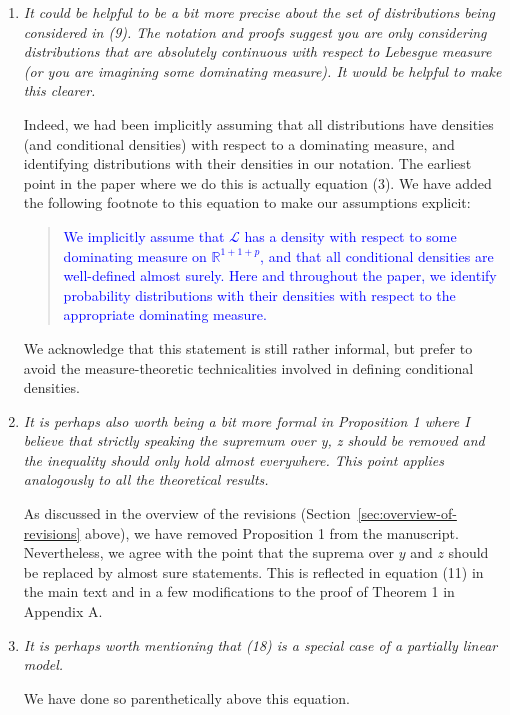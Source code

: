\documentclass[12pt]{article}
\begin{document}
\begin{enumerate}
	\item \textsl{It could be helpful to be a bit more precise about the set of distributions being considered in (9). The notation and proofs suggest you are only considering distributions that are absolutely continuous with respect to Lebesgue measure (or you are imagining some dominating measure). It would be helpful to make this clearer.}
	
	Indeed, we had been implicitly assuming that all distributions have densities (and conditional densities) with respect to a dominating measure, and identifying distributions with their densities in our notation. The earliest point in the paper where we do this is actually equation (3). We have added the following footnote to this equation to make our assumptions explicit:
	
	\begin{quote}
	\textcolor{blue}{We implicitly assume that $\mathcal L$ has a density with respect to some dominating measure on $\mathbb R^{1+1+p}$, and that all conditional densities are well-defined almost surely. Here and throughout the paper, we identify probability distributions with their densities with respect to the appropriate dominating measure.}
	\end{quote}

	We acknowledge that this statement is still rather informal, but prefer to avoid the measure-theoretic technicalities involved in defining conditional densities.

	\item \textsl{It is perhaps also worth being a bit more formal in Proposition 1 where I believe that strictly speaking the supremum over y, z should be removed and the inequality should only hold almost everywhere. This point applies analogously to all the theoretical results.}
	
	As discussed in the overview of the revisions (Section~\ref{sec:overview-of-revisions} above), we have removed Proposition 1 from the manuscript. Nevertheless, we agree with the point that the suprema over $y$ and $z$ should be replaced by almost sure statements. This is reflected in equation (11) in the main text and in a few modifications to the proof of Theorem 1 in Appendix A.

	\item \textsl{It is perhaps worth mentioning that (18) is a special case of a partially linear model.}
	
	We have done so parenthetically above this equation.
	

\end{enumerate}
\end{document}
